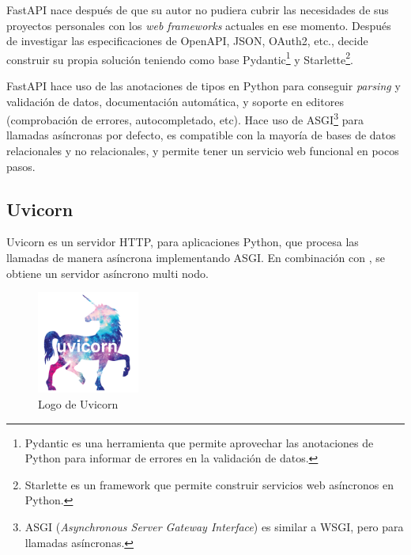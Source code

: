FastAPI nace después de que su autor no pudiera cubrir las necesidades de sus proyectos personales con los \emph{web frameworks} actuales en ese momento. Después de investigar las especificaciones de OpenAPI, JSON, OAuth2, etc., decide construir su propia solución teniendo como base Pydantic\footnote{Pydantic es una herramienta que permite aprovechar las anotaciones de Python para informar de errores en la validación de datos.} y Starlette\footnote{Starlette es un framework que permite construir servicios web asíncronos en Python.}. \emph{\parencite{Reference15}}

FastAPI hace uso de las anotaciones de tipos en Python para conseguir \emph{parsing} y validación de datos, documentación automática, y soporte en editores (comprobación de errores, autocompletado, etc). Hace uso de ASGI\footnote{ASGI (\emph{Asynchronous Server Gateway Interface}) es similar a WSGI, pero para llamadas asíncronas.} para llamadas asíncronas por defecto, es compatible con la mayoría de bases de datos relacionales y no relacionales, y permite tener un servicio web funcional en pocos pasos. \emph{\parencite{Reference14}}

\subsection{Uvicorn}

Uvicorn es un servidor HTTP, para aplicaciones Python, que procesa las llamadas de manera asíncrona implementando ASGI. En combinación con , se obtiene un servidor asíncrono multi nodo. \emph{\parencite{Reference16}}

\begin{figure}[ht]
    \centering
    \includegraphics[width=0.3\textwidth]{Figures/uvicorn-logo}
    \decoRule
    \caption[Uvicorn (Logo)]{Logo de Uvicorn \emph{\parencite{Reference16}}}
    \label{fig:uvicorn-logo}
\end{figure}


